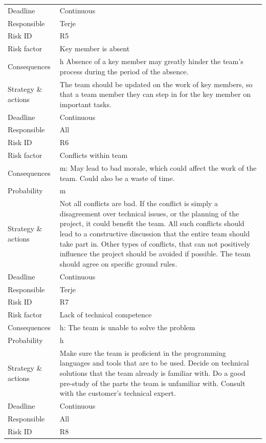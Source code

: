 \begin{longtable}{>{\footnotesize}p{} >{\footnotesize}p{}}
	Deadline & Continuous \\
	Responsible & Terje \\
	\midrule
	Risk ID & R5 \\
	Risk factor & Key member is absent \\
	Consequences & \Gls{h} Absence of a key member may greatly hinder the team's process during the period of the absence. \\
	Strategy \& actions & The team should be updated on the work of key members, so that a team member they can step in for the key member on important tasks. \\
	Deadline & Continuous \\
	Responsible & All \\
	\midrule
	Risk ID & R6 \\
	Risk factor & Conflicts within team \\
	Consequences & \Gls{m}: May lead to bad morale, which could affect the work of the team. Could also be a waste of time. \\
	Probability & \Gls{m} \\ 
	Strategy \& actions & Not all conflicts are bad. If the conflict is simply a disagreement over technical issues, or the planning of the project, it could benefit the team. All such conflicts should lead to a constructive discussion that the entire team should take part in. Other types of conflicts, that can not positively influence the project should be avoided if possible. The team should agree on specific ground rules. \\
	Deadline & Continuous \\
	Responsible & Terje \\
	\midrule
	Risk ID & R7 \\
	Risk factor & Lack of technical competence \\
	Consequences & \Gls{h}: The team is unable to solve the problem  \\
	Probability & \Gls{h} \\ 
	Strategy \& actions & Make sure the team is proficient in the programming languages and tools that are to be used. Decide on technical solutions that the team already is familiar with. Do a good pre-study of the parts the team is unfamiliar with. Consult with the customer’s technical expert. \\
	Deadline & Continuous \\
	Responsible & All \\
	\midrule
	Risk ID & R8 \\

\end{longtable}
